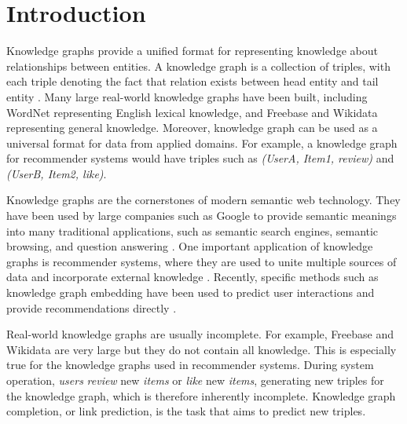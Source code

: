 \documentclass[sigconf,edbt]{acmart-edbt2019}
\begin{document}
\maketitle              
\section{Introduction}
Knowledge graphs provide a unified format for representing knowledge about relationships between entities. A knowledge graph is a collection of triples, with each triple  denoting the fact that relation  exists between head entity  and tail entity . Many large real-world knowledge graphs have been built, including WordNet \cite{millergeorgea._wordnetlexicaldatabase_1995} representing English lexical knowledge, and Freebase \cite{bollacker_freebasecollaborativelycreated_2008} and Wikidata \cite{vrandecic_wikidatafreecollaborative_2014} representing general knowledge. Moreover, knowledge graph can be used as a universal format for data from applied domains. For example, a knowledge graph for recommender systems would have triples such as \textit{(UserA, Item1, review)} and \textit{(UserB, Item2, like)}.

Knowledge graphs are the cornerstones of modern semantic web technology. They have been used by large companies such as Google to provide semantic meanings into many traditional applications, such as semantic search engines, semantic browsing, and question answering \cite{amitsinghal_officialgoogleblog_2012}. One important application of knowledge graphs is recommender systems, where they are used to unite multiple sources of data and incorporate external knowledge \cite{carrer-neto_socialknowledgebasedrecommender_2012} \cite{zhang_collaborativeknowledgebase_2016}. Recently, specific methods such as knowledge graph embedding have been used to predict user interactions and provide recommendations directly \cite{he_translationbasedrecommendation_2017}.

Real-world knowledge graphs are usually incomplete. For example, Freebase and Wikidata are very large but they do not contain all knowledge. This is especially true for the knowledge graphs used in recommender systems. During system operation, \textit{users} \textit{review} new \textit{items} or \textit{like} new \textit{items}, generating new triples for the knowledge graph, which is therefore inherently incomplete. Knowledge graph completion, or link prediction, is the task that aims to predict new triples.
\end{document}
